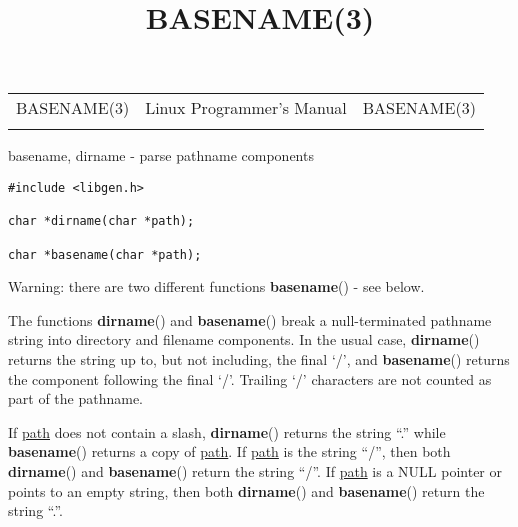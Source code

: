 \documentclass[]{article}
\title{BASENAME(3)}
\author{}
\date{}
\let\realtextbf=\textbf
\renewcommand{\textbf}[1]{\textcolor{boldcolor}{\realtextbf{#1}}}
\renewcommand{\emph}[1]{\underline{#1}}
\begin{document}
\maketitle

\begin{longtable}[c]{@{}lll@{}}
\toprule\addlinespace
BASENAME(3) & Linux Programmer's Manual & BASENAME(3)
\\\addlinespace
\bottomrule
\end{longtable}


basename, dirname - parse pathname components


\begin{verbatim}
#include <libgen.h>
 
char *dirname(char *path);

char *basename(char *path);
\end{verbatim}


Warning: there are two different functions \textbf{basename}() - see
below.

The functions \textbf{dirname}() and \textbf{basename}() break a
null-terminated pathname string into directory and filename components.
In the usual case, \textbf{dirname}() returns the string up to, but not
including, the final `/', and \textbf{basename}() returns the component
following the final `/'. Trailing `/' characters are not counted as part
of the pathname.

If \emph{path} does not contain a slash, \textbf{dirname}() returns the
string ``.'' while \textbf{basename}() returns a copy of \emph{path}. If
\emph{path} is the string ``/'', then both \textbf{dirname}() and
\textbf{basename}() return the string ``/''. If \emph{path} is a NULL
pointer or points to an empty string, then both \textbf{dirname}() and
\textbf{basename}() return the string ``.''.
\end{document}
